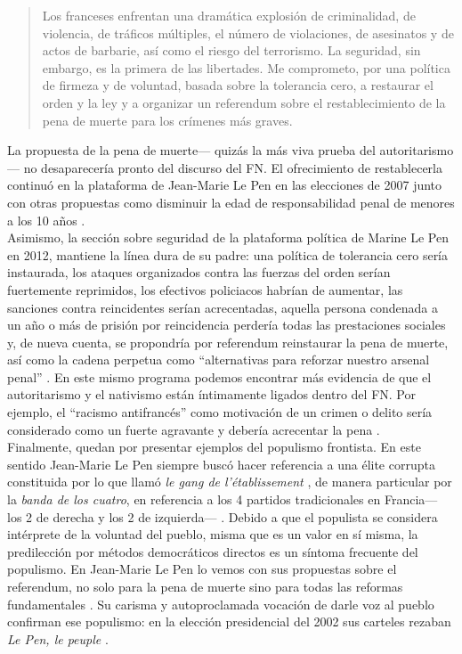 \begin{quote}
Los franceses enfrentan una dramática explosión de criminalidad, de violencia, de tráficos múltiples, el número de violaciones, de asesinatos y de actos de barbarie, así como el riesgo del terrorismo. La seguridad, sin embargo, es la primera de las libertades. Me comprometo, por una política de firmeza y de voluntad, basada sobre la tolerancia cero, a restaurar el orden y la ley y a organizar un referendum sobre el restablecimiento de la pena de muerte para los crímenes más graves. 
\end{quote}

La propuesta de la pena de muerte--- quizás la más viva prueba del autoritarismo--- no desaparecería pronto del discurso del FN. El ofrecimiento de restablecerla continuó en la plataforma de Jean-Marie Le Pen en las elecciones de 2007 junto con otras propuestas como disminuir la edad de responsabilidad penal de menores a los 10 años \parencite{LObs07}.\\ 

Asimismo, la sección sobre seguridad de la plataforma política de Marine Le Pen en 2012, mantiene la línea dura de su padre: una política de tolerancia cero sería instaurada, los ataques organizados contra las fuerzas del orden serían fuertemente reprimidos, los efectivos policiacos habrían de aumentar, las sanciones contra reincidentes serían acrecentadas, aquella persona condenada a un año o más de prisión por reincidencia perdería todas las prestaciones sociales y, de nueva cuenta, se propondría por referendum reinstaurar la pena de muerte, así como la cadena perpetua como ``alternativas para reforzar nuestro arsenal penal'' \parencite{LePen12}. En este mismo programa podemos encontrar más evidencia de que el autoritarismo y el nativismo están íntimamente ligados dentro del FN. Por ejemplo, el ``racismo antifrancés'' como motivación de un crimen o delito sería considerado como un fuerte agravante y debería acrecentar la pena \parencite[6]{LePen12}.\\

Finalmente, quedan por presentar ejemplos del populismo frontista. En este sentido Jean-Marie Le Pen siempre buscó hacer referencia a una élite corrupta constituida por lo que llamó \textit{le gang de l'établissement} \parencite{Leprince16}, de manera particular por la \textit{banda de los cuatro}, en referencia a los 4 partidos tradicionales en Francia--- los 2 de derecha y los 2 de izquierda--- \parencite[32]{Boily05}. Debido a que el populista se considera intérprete de la voluntad del pueblo, misma que es un valor en sí misma, la predilección por métodos democráticos directos es un síntoma frecuente del populismo. En Jean-Marie Le Pen lo vemos con sus propuestas sobre el referendum, no solo para la pena de muerte sino para todas las reformas fundamentales \parencite{LObs07}. Su carisma y autoproclamada vocación de darle voz al pueblo confirman ese populismo: en la elección presidencial del 2002 sus carteles rezaban \textit{Le Pen, le peuple} \parencite{Gross16}.\\ 

